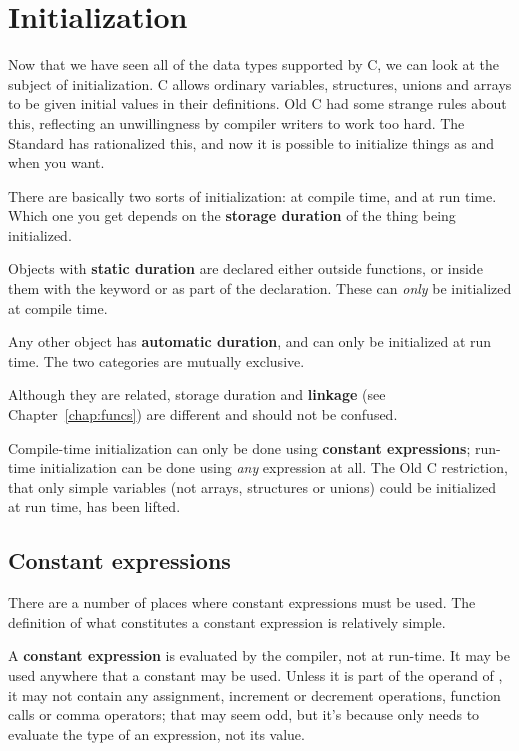  
        \section{Initialization}
        

  

  Now that we have seen all of the data types supported by C, we can look at
   the subject of initialization. C allows ordinary variables, structures,
   unions and arrays to be given initial values in their definitions. Old C had
   some strange rules about this, reflecting an unwillingness by compiler
   writers to work too hard. The Standard has rationalized this, and now it is
   possible to initialize things as and when you want.


  There are basically two sorts of initialization: at compile time, and at
   run time. Which one you get depends on the \textbf{storage duration} of
   the thing being initialized.


  Objects with \textbf{static duration} are declared either outside
   functions, or inside them with the keyword \extern{} or
   \static{} as part of the declaration. These can \textit{only} be
   initialized at compile time.


  Any other object has \textbf{automatic duration}, and can only be
   initialized at run time. The two categories are mutually exclusive.


   Although they are related,
   storage duration and \textbf{linkage} (see Chapter~\ref{chap:funcs})
   are different and should not be confused.


  Compile-time initialization can only be done using \textbf{constant
   expressions}; run-time initialization can be done using \textit{any}
   expression at all. The Old C restriction, that only simple variables (not
   arrays, structures or unions) could be initialized at run time, has been
   lifted.


  \subsection{Constant expressions}
   

   There are a number of places where constant expressions must be used. The
    definition of what constitutes a constant expression is relatively
    simple.


   A \textbf{constant expression} is evaluated by the compiler, not at
    run-time. It may be used anywhere that a constant may be used. Unless it is
    part of the operand of \sizeof, it may not contain any
    assignment, increment or decrement operations, function calls or comma
    operators; that may seem odd, but it's because \sizeof{} only
    needs to evaluate the type of an expression, not its value.


